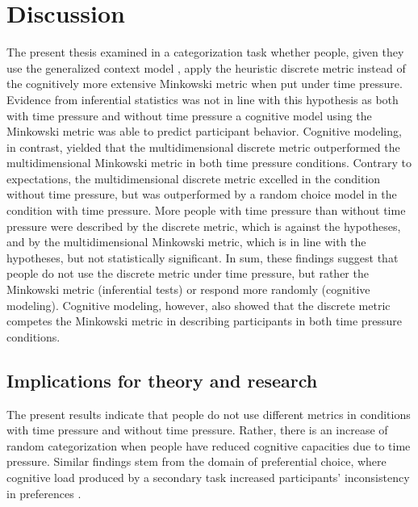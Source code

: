 \documentclass[a4paper,man,natbib]{apa6}
\begin{document}
\section{Discussion}
The present thesis examined in a categorization task whether people, given they use the generalized context model \citep{nosofsky1986attention}, apply the heuristic discrete metric instead of the cognitively more extensive Minkowski metric when put under time pressure. Evidence from inferential statistics was not in line with this hypothesis as both with time pressure and without time pressure a cognitive model using the Minkowski metric was able to predict participant behavior. Cognitive modeling, in contrast, yielded that the multidimensional discrete metric outperformed the multidimensional Minkowski metric in both time pressure conditions. Contrary to expectations, the multidimensional discrete metric excelled in the condition without time pressure, but was outperformed by a random choice model in the condition with time pressure. More people with time pressure than without time pressure were described by the discrete metric, which is against the hypotheses, and by the multidimensional Minkowski metric, which is in line with the hypotheses, but not statistically significant. In sum, these findings suggest that people do not use the discrete metric under time pressure, but rather the Minkowski metric (inferential tests) or respond more randomly (cognitive modeling). Cognitive modeling, however, also showed that the discrete metric competes the Minkowski metric in describing participants in both time pressure conditions. 
\subsection{Implications for theory and research}
The present results indicate that people do not use different metrics in conditions with time pressure and without time pressure. Rather, there is an increase of random categorization when people have reduced cognitive capacities due to time pressure. Similar findings stem from the domain of preferential choice, where cognitive load produced by a secondary task increased participants' inconsistency in preferences \citep{olschewski2018taxing, burks2009cognitive}. 
\end{document}

